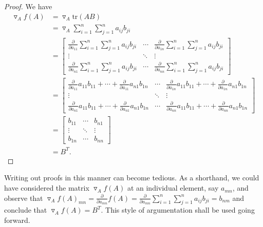 \documentclass{article}
\begin{document}
\begin{proof}
We have 
\begin{align}
\triangledown_A f(A) &= \triangledown_A \mathrm{tr}(AB) \\
&= \triangledown_A \sum_{i=1}^n \sum_{j=1}^n a_{ij} b_{ji} \\
&= \begin{bmatrix}
\frac{\partial}{\partial a_{11}} \sum_{i=1}^n \sum_{j=1}^n a_{ij} b_{ji} & \cdots & \frac{\partial}{\partial a_{1n}} \sum_{i=1}^n \sum_{j=1}^n a_{ij} b_{ji} \\
\vdots & \ddots & \vdots \\
\frac{\partial}{\partial a_{n1}} \sum_{i=1}^n \sum_{j=1}^n a_{ij} b_{ji} & \cdots & \frac{\partial}{\partial a_{nn}} \sum_{i=1}^n \sum_{j=1}^n a_{ij} b_{ji}
\end{bmatrix} \\
&= \begin{bmatrix}
\frac{\partial}{\partial a_{11}} a_{11} b_{11} + \cdots + \frac{\partial}{\partial a_{11}} a_{n1} b_{1n} & \cdots & \frac{\partial}{\partial a_{1n}} a_{11} b_{11} + \cdots + \frac{\partial}{\partial a_{1n}} a_{n1} b_{1n} \\
\vdots & \ddots & \vdots \\
\frac{\partial}{\partial a_{n1}} a_{11} b_{11} + \cdots + \frac{\partial}{\partial a_{n1}} a_{n1} b_{1n} & \cdots & \frac{\partial}{\partial a_{nn}} a_{11} b_{11} + \cdots + \frac{\partial}{\partial a_{nn}} a_{n1} b_{1n}
\end{bmatrix} \\
&= \begin{bmatrix}
b_{11} & \cdots & b_{n1} \\
\vdots & \ddots & \vdots \\
b_{1n} & \cdots & b_{nn}
\end{bmatrix} \\
&= B^T.
\end{align}
\end{proof}

\begin{remark}
Writing out proofs in this manner can become tedious. As a shorthand, we could have considered the
matrix $\triangledown_A f(A)$ at an individual element, say $a_{mn}$, and observe that
$\triangledown_A f(A)_{mn} = \frac{\partial}{\partial a_{mn}} f(A) = 
\frac{\partial}{\partial a_{mn}} \sum_{i=1}^n \sum_{j=1}^n a_{ij} b_{ji} = b_{nm}$ and conclude that
$\triangledown_A f(A) = B^T$. This style of argumentation shall be used going forward.
\end{remark}
\end{document}
